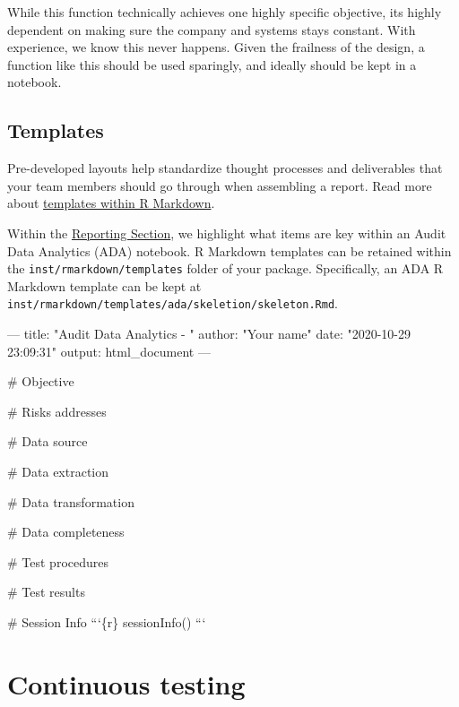 \documentclass[
]{book}
\newenvironment{Shaded}{\begin{snugshade}}{\end{snugshade}}
\newcommand{\BaseNTok}[1]{\textcolor[rgb]{0.00,0.00,0.81}{#1}}
\newcommand{\FunctionTok}[1]{\textcolor[rgb]{0.00,0.00,0.00}{#1}}
\newcommand{\NormalTok}[1]{#1}
\begin{document}
While this function technically achieves one highly specific objective, its highly dependent on making sure the company and systems stays constant. With experience, we know this never happens. Given the frailness of the design, a function like this should be used sparingly, and ideally should be kept in a notebook.

\hypertarget{templates}{%
\section{Templates}\label{templates}}

Pre-developed layouts help standardize thought processes and deliverables that your team members should go through when assembling a report. Read more about \href{https://bookdown.org/yihui/rmarkdown-cookbook/package-template.html}{templates within R Markdown}.

Within the \protect\hyperlink{report-structure}{Reporting Section}, we highlight what items are key within an Audit Data Analytics (ADA) notebook. R Markdown templates can be retained within the \texttt{inst/rmarkdown/templates} folder of your package. Specifically, an ADA R Markdown template can be kept at \texttt{inst/rmarkdown/templates/ada/skeletion/skeleton.Rmd}.

\begin{Shaded}
\begin{Highlighting}[]
\NormalTok{---}
\NormalTok{title: "Audit Data Analytics - "}
\NormalTok{author: "Your name"}
\NormalTok{date: "2020-10-29 23:09:31"}
\NormalTok{output:}
\NormalTok{  html_document}
\NormalTok{---}

\FunctionTok{# Objective}

\FunctionTok{# Risks addresses}

\FunctionTok{# Data source}

\FunctionTok{# Data extraction}

\FunctionTok{# Data transformation}

\FunctionTok{# Data completeness}

\FunctionTok{# Test procedures}

\FunctionTok{# Test results}

\FunctionTok{# Session Info}
\BaseNTok{```\{r\}}
\BaseNTok{sessionInfo()}
\BaseNTok{```}
\end{Highlighting}
\end{Shaded}

\hypertarget{continuous-testing}{%
\chapter{Continuous testing}\label{continuous-testing}}
\end{document}
